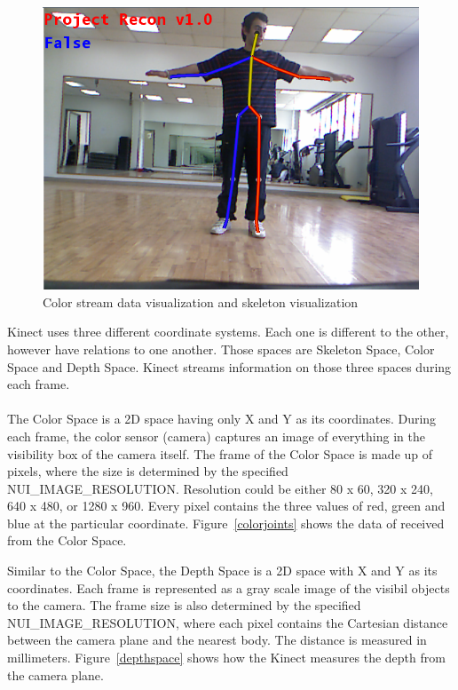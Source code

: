 \begin{figure}[!htbp]
\centering
\includegraphics[width=1\textwidth]{images/color_skeleton.png}
\caption{Color stream data visualization and skeleton visualization}
\label{colorskeleton}
\end{figure}

Kinect uses three different coordinate systems. Each one is different to the other, however have relations to one another. Those spaces are Skeleton Space, Color Space and Depth Space. Kinect streams information on those three spaces during each frame.
\\
\\
The Color Space is a 2D space having only X and Y as its coordinates. During each frame, the color sensor (camera) captures an image of everything in the visibility box of the camera itself. The frame of the Color Space is made up of pixels, where the size is determined by the specified NUI\_IMAGE\_RESOLUTION. Resolution could be either 80 x 60, 320 x 240, 640 x 480, or 1280 x 960. Every pixel contains the three values of red, green and blue at the particular coordinate. Figure~\ref{colorjoints} shows the data of received from the Color Space.

Similar to the Color Space, the Depth Space is a 2D space with X and Y as its coordinates. Each frame is represented as a gray scale image of the visibil objects to the camera. The frame size is also determined by the specified NUI\_IMAGE\_RESOLUTION, where each pixel contains the Cartesian distance between the camera plane and the nearest body. The distance is measured in millimeters. Figure~\ref{depthspace} shows how the Kinect measures the depth from the camera plane.

